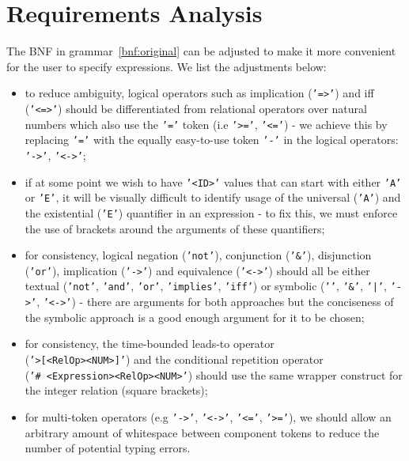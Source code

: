 \documentclass[12pt,oneside,a4paper,notitlepage]{report}
\newcommand{\texttilde}{\raisebox{0.5ex}{\texttildelow}}
\begin{document}
	\section*{Requirements Analysis}
	\par The BNF in grammar~\ref{bnf:original} can be adjusted to make it more convenient for the user to specify expressions. We list the adjustments below:
	\begin{itemize}
		\item to reduce ambiguity, logical operators such as implication (\texttt{'=\textgreater'}) and iff (\texttt{'\textless=\textgreater'}) should be differentiated from relational operators over natural numbers which also use the \texttt{'='} token (i.e \texttt{'\textgreater='}, \texttt{'\textless='}) - we achieve this by replacing \texttt{'='} with the equally easy-to-use token \texttt{'-'} in the logical operators: \texttt{'-\textgreater'}, \texttt{'\textless-\textgreater'};
		\item if at some point we wish to have \texttt{'\textless ID\textgreater'} values that can start with either \texttt{'A'} or \texttt{'E'}, it will be visually difficult to identify usage of the universal (\texttt{'A'}) and the existential (\texttt{'E'}) quantifier in an expression - to fix this, we must enforce the use of brackets around the arguments of these quantifiers;
		\item for consistency, logical negation (\texttt{'not'}), conjunction (\texttt{'\&'}), disjunction (\texttt{'or'}), implication (\texttt{'-\textgreater'}) and equivalence (\texttt{'\textless-\textgreater'}) should all be either textual (\texttt{'not'}, \texttt{'and'}, \texttt{'or'}, \texttt{'implies'}, \texttt{'iff'}) or symbolic (\texttt{'\texttilde'}, \texttt{'\&'}, \texttt{'|'}, \texttt{'-\textgreater'}, \texttt{'\textless-\textgreater'}) - there are arguments for both approaches but the conciseness of the symbolic approach is a good enough argument for it to be chosen;
		\item for consistency, the time-bounded leads-to operator \\ (\texttt{'\texttilde\textgreater [\textless RelOp\textgreater \textless NUM\textgreater]'}) and the conditional repetition operator \\ (\texttt{'\#~\textless Expression\textgreater \textless RelOp\textgreater \textless NUM\textgreater'}) should use the same wrapper construct for the integer relation (square brackets);
		\item for multi-token operators (e.g \texttt{'-\textgreater'}, \texttt{'\textless-\textgreater'}, \texttt{'\textless='}, \texttt{'\textgreater='}), we should allow an arbitrary amount of whitespace between component tokens to reduce the number of potential typing errors.
	\end{itemize}
\end{document}

